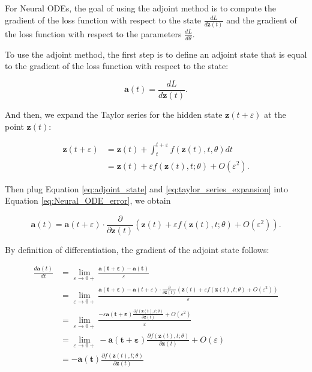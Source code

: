 \documentclass[
	parskip, 			   %
	twoside, 			   %
	DIV=14, 			   %
	BCOR=15.0mm, 		   %
	headsepline, 		   %
	open=right, 		   %
	captions=tableheading, %
	bibliography=totoc,    %
	numbers=noenddot       %
]{scrreprt}
\begin{document}
For Neural ODEs, the goal of using the adjoint method is to compute the gradient of the loss function with respect to the state $\frac{d L}{d\mathbf{z}(t)}$ and the gradient of the loss function with respect to the parameters $\frac{d L}{d\theta}$.

To use the adjoint method, the first step is to define an adjoint state that is equal to the gradient of the loss function with respect to the state:

\begin{equation}
    \label{eq:adjoint_state}
    \mathbf{a}(t) = \frac{d L}{d\mathbf{z}(t)}.
\end{equation}

And then, we expand the Taylor series for the hidden state $\mathbf{z}(t+\varepsilon )$ at the point $\mathbf{z}(t)$:

\begin{equation}
    \label{eq:taylor_series_expansion}
    \begin{aligned}
    \mathbf{z}(t+\varepsilon ) &= \mathbf{z}(t) + \int_{t}^{t+\varepsilon } f(\mathbf{z}(t), t, \theta)dt\\
    &= \mathbf{z}(t) + \varepsilon f(\mathbf{z}(t), t; \theta) + O (\varepsilon ^2).
    \end{aligned}
\end{equation}

Then plug Equation \ref{eq:adjoint_state} and \ref{eq:taylor_series_expansion} into Equation \ref{eq:Neural_ODE_error}, we obtain

\begin{equation}
    \label{eq:Neural_ODE_adjoint_state}
    \mathbf{a}(t) = \mathbf{a}(t+\varepsilon ) \cdot \frac{\partial}{\partial \mathbf{z}(t)} (\mathbf{z}(t) + \varepsilon f(\mathbf{z}(t), t; \theta) + O (\varepsilon ^2)) .
\end{equation}

By definition of differentiation, the gradient of the adjoint state follows:

\begin{equation}
    \label{eq:adjoint_state_gradient_hidden_state}
    \begin{aligned}
        \frac{d\mathbf{a}(t)}{dt} &= \lim_{\varepsilon \to 0+} \frac{\mathbf{a(t+\varepsilon)}-\mathbf{a(t)}}{\varepsilon} \\
        &= \lim_{\varepsilon \to 0+} \frac{\mathbf{a(t+\varepsilon)}-\mathbf{a}(t+\varepsilon ) \cdot \frac{\partial}{\partial \mathbf{z}(t)} (\mathbf{z}(t) + \varepsilon f(\mathbf{z}(t), t; \theta) + O (\varepsilon ^2)) }{\varepsilon}\\
        &= \lim_{\varepsilon \to 0+} \frac{-\varepsilon \mathbf{a(t+\varepsilon)} \frac{\partial f(\mathbf{z}(t), t; \theta)}{\partial \mathbf{z}(t)} + O (\varepsilon ^2)}{\varepsilon}\\
        &= \lim_{\varepsilon \to 0+} - \mathbf{a(t+\varepsilon)} \frac{\partial f(\mathbf{z}(t), t; \theta)}{\partial \mathbf{z}(t)} + O (\varepsilon)\\
        &= - \mathbf{a(t)} \frac{\partial f(\mathbf{z}(t), t; \theta)}{\partial \mathbf{z}(t)}
    \end{aligned}
\end{equation}
\end{document}
